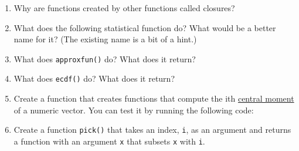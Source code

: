 \begin{enumerate}
\def\labelenumi{\arabic{enumi}.}
\item
  Why are functions created by other functions called closures?
\item
  What does the following statistical function do? What would be a
  better name for it? (The existing name is a bit of a hint.)

\begin{Shaded}
\begin{Highlighting}[]
\StringTok{ }
  \StringTok{ }\NormalTok{) \{}
    \StringTok{ }\StringTok{ }\NormalTok{) /}\StringTok{ }
  \NormalTok{\}}
\NormalTok{\}}
\end{Highlighting}
\end{Shaded}
\item
  What does \texttt{approxfun()} do? What does it return?
\item
  What does \texttt{ecdf()} do? What does it return?
\item
  Create a function that creates functions that compute the ith
  \href{http://en.wikipedia.org/wiki/Central_moment}{central moment} of
  a numeric vector. You can test it by running the following code:

\begin{Shaded}
\begin{Highlighting}[]
\StringTok{ }\NormalTok{(}\NormalTok{)}
\StringTok{ }\NormalTok{(}\NormalTok{)}

\StringTok{ }\NormalTok{(}\NormalTok{)}
\NormalTok{(}\NormalTok{(}\NormalTok{))}
\NormalTok{(}\NormalTok{(}\StringTok{ } \NormalTok{/}\StringTok{ }\NormalTok{))}
\end{Highlighting}
\end{Shaded}
\item
  Create a function \texttt{pick()} that takes an index, \texttt{i}, as
  an argument and returns a function with an argument \texttt{x} that
  subsets \texttt{x} with \texttt{i}.

\begin{Shaded}
\begin{Highlighting}[]
\NormalTok{(}\NormalTok{))}
\NormalTok{(mtcars, function(x) x[[}\NormalTok{]])}
\end{Highlighting}
\end{Shaded}
\end{enumerate}

